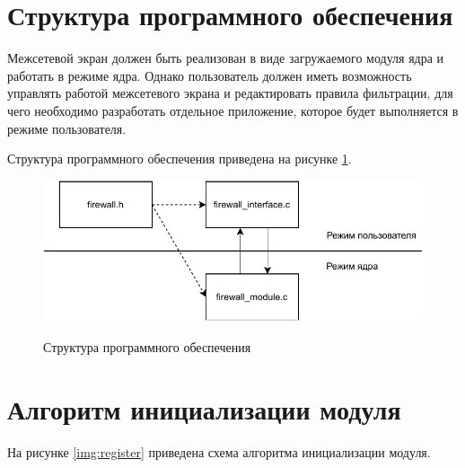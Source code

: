 \section{Структура программного обеспечения}

Межсетевой экран должен быть реализован в виде загружаемого модуля ядра и работать в режиме ядра. Однако пользователь должен иметь возможность управлять работой межсетевого экрана и редактировать правила фильтрации, для чего необходимо разработать отдельное приложение, которое будет выполняется в режиме пользователя.

Структура программного обеспечения приведена на рисунке \ref{img:structure}.

\begin{figure}[h!]
	\begin{center}
		{\includegraphics[scale = 1]{inc/img/structure.pdf}}
		\caption{Структура программного обеспечения}
		\label{img:structure}
	\end{center}
\end{figure}

\section{Алгоритм инициализации модуля}

На рисунке \ref{img:register} приведена схема алгоритма инициализации модуля.

